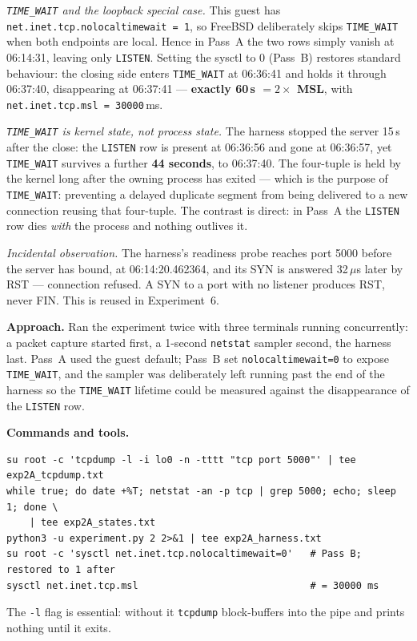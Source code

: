 \documentclass[11pt,a4paper]{article}
\newcommand{\cmd}[1]{\texttt{\small #1}}
\begin{document}
\emph{\cmd{TIME\_WAIT} and the loopback special case.} This guest has
\cmd{net.inet.tcp.nolocaltimewait = 1}, so FreeBSD deliberately skips
\cmd{TIME\_WAIT} when both endpoints are local. Hence in Pass~A the two rows
simply vanish at 06:14:31, leaving only \cmd{LISTEN}. Setting the sysctl to 0
(Pass~B) restores standard behaviour: the closing side enters \cmd{TIME\_WAIT}
at 06:36:41 and holds it through 06:37:40, disappearing at 06:37:41 ---
\textbf{exactly 60\,s $= 2 \times$ MSL}, with \cmd{net.inet.tcp.msl = 30000}\,ms.

\emph{\cmd{TIME\_WAIT} is kernel state, not process state.} The harness stopped
the server 15\,s after the close: the \cmd{LISTEN} row is present at 06:36:56 and
gone at 06:36:57, yet \cmd{TIME\_WAIT} survives a further \textbf{44 seconds}, to
06:37:40. The four-tuple is held by the kernel long after the owning process has
exited --- which is the purpose of \cmd{TIME\_WAIT}: preventing a delayed
duplicate segment from being delivered to a new connection reusing that
four-tuple. The contrast is direct: in Pass~A the \cmd{LISTEN} row dies
\emph{with} the process and nothing outlives it.

\emph{Incidental observation.} The harness's readiness probe reaches port 5000
before the server has bound, at 06:14:20.462364, and its SYN is answered
32\,$\mu$s later by RST --- connection refused. A SYN to a port with
no listener produces RST, never FIN. This is reused in Experiment~6.

\textbf{Approach.} Ran the experiment twice with three terminals running
concurrently: a packet capture started first, a 1-second \cmd{netstat} sampler
second, the harness last. Pass~A used the guest default; Pass~B set
\cmd{nolocaltimewait=0} to expose \cmd{TIME\_WAIT}, and the sampler was
deliberately left running past the end of the harness so the \cmd{TIME\_WAIT}
lifetime could be measured against the disappearance of the \cmd{LISTEN} row.

\textbf{Commands and tools.}
\begin{Verbatim}[fontsize=\small,frame=single]
su root -c 'tcpdump -l -i lo0 -n -tttt "tcp port 5000"' | tee exp2A_tcpdump.txt
while true; do date +%T; netstat -an -p tcp | grep 5000; echo; sleep 1; done \
    | tee exp2A_states.txt
python3 -u experiment.py 2 2>&1 | tee exp2A_harness.txt
su root -c 'sysctl net.inet.tcp.nolocaltimewait=0'   # Pass B; restored to 1 after
sysctl net.inet.tcp.msl                              # = 30000 ms
\end{Verbatim}
The \cmd{-l} flag is essential: without it \cmd{tcpdump} block-buffers into the
pipe and prints nothing until it exits.
\end{document}
